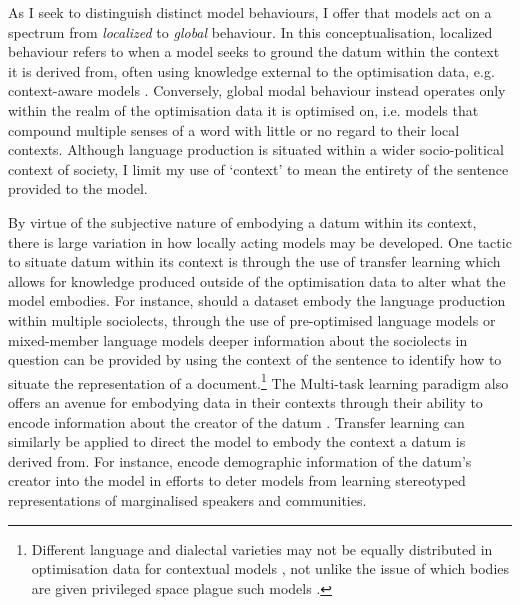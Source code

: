 {As I seek to distinguish distinct model behaviours, I offer that models act on a spectrum from \textit{localized} to \textit{global} behaviour.
In this conceptualisation, localized behaviour refers to when a model seeks to ground the datum within the context it is derived from, often using knowledge external to the optimisation data, e.g. context-aware models \citep{Garcia:2019,Devlin:2019}.
Conversely, global modal behaviour instead operates only within the realm of the optimisation data it is optimised on, i.e. models that compound multiple senses of a word with little or no regard to their local contexts.
Although language production is situated within a wider socio-political context of society, I limit my use of `context' to mean the entirety of the sentence provided to the model.

By virtue of the subjective nature of embodying a datum within its context, there is large variation in how locally acting models may be developed.
One tactic to situate datum within its context is through the use of transfer learning which allows for knowledge produced outside of the optimisation data to alter what the model embodies.
For instance, should a dataset embody the language production within multiple sociolects, through the use of pre-optimised language models \citep{Devlin:2019} or mixed-member language models \citep{Blodgett:2016} deeper information about the sociolects in question can be provided by using the context of the sentence to identify how to situate the representation of a document.\footnote{Different language and dialectal varieties may not be equally distributed in optimisation data for contextual models \citep{Dunn:2020}, not unlike the issue of which bodies are given privileged space plague such models \citep{Tan-Celis:2019}.}
The Multi-task learning paradigm also offers an avenue for embodying data in their contexts through their ability to encode information about the creator of the datum \citep{Benton:2017,Garcia:2019}.
Transfer learning can similarly be applied to direct the model to embody the context a datum is derived from.
For instance, \citet{Romanov:2019} encode demographic information of the datum's creator into the model in efforts to deter models from learning stereotyped representations of marginalised speakers and communities.

}
